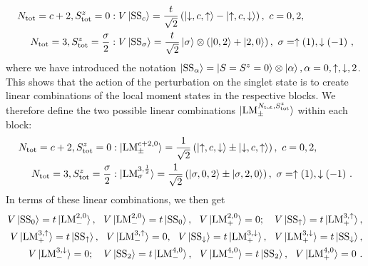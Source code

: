 \begin{eqnarray}
	N_\text{tot} = c+2, S_\text{tot}^z = 0 &: V\ket{\text{SS}_c} = \frac{t}{\sqrt 2}\left( \ket{\downarrow,c,\uparrow} - \ket{\uparrow,c,\downarrow} \right),~ c=0,2,\nonumber\\
	N_\text{tot} = 3, S_\text{tot}^z = \frac{\sigma}{2} &: V\ket{\text{SS}_\sigma} = \frac{t}{\sqrt 2}\ket{\sigma}\otimes\left(\ket{0,2} + \ket{2,0}\right),~\sigma=\uparrow(1),\downarrow(-1)~,
\end{eqnarray}
where we have introduced the notation \(\ket{\text{SS}_{\alpha}} = \ket{S=S^z=0}\otimes\ket{\alpha},\alpha=0,\uparrow,\downarrow,2\). This shows that the action of the perturbation on the singlet state is to create linear combinations of the local moment states in the respective blocks. We therefore define the two possible linear combinations \(\ket{\text{LM}_\pm^{N_\text{tot},S_\text{tot}^z}}\) within each block:
\begin{eqnarray}
	N_\text{tot} = c+2, S_\text{tot}^z = 0 &: \ket{\text{LM}_\pm^{c+2,0}} = \frac{1}{\sqrt 2}\left(\ket{\uparrow, c, \downarrow} \pm \ket{\downarrow, c, \uparrow}\right),~c=0,2,\nonumber\\
	N_\text{tot} = 3, S_\text{tot}^z = \frac{\sigma}{2} &: \ket{\text{LM}_{\sigma}^{3,\frac{1}{2}}} = \frac{1}{\sqrt 2}\left(\ket{\sigma, 0, 2} \pm \ket{\sigma, 2, 0}\right),~\sigma=\uparrow(1), \downarrow(-1)~.
\end{eqnarray}
In terms of these linear combinations, we then get
\begin{eqnarray}
	V\ket{\text{SS}_0} = t\ket{\text{LM}_-^{2,0}}, ~ ~ V\ket{\text{LM}_-^{2,0}} = t\ket{\text{SS}_0}, ~ ~V\ket{\text{LM}_+^{2,0}} = 0; \quad V\ket{\text{SS}_\uparrow} = t\ket{\text{LM}_+^{3, \uparrow}},\nonumber \\
	V\ket{\text{LM}_+^{3, \uparrow}} = t\ket{\text{SS}_\uparrow}, ~ ~V\ket{\text{LM}_-^{3, \uparrow}} = 0, ~ ~ V\ket{\text{SS}_\downarrow} = t\ket{\text{LM}_+^{3, \downarrow}}, ~ ~ V\ket{\text{LM}_+^{3, \downarrow}} = t\ket{\text{SS}_\downarrow},\nonumber \\
	V\ket{\text{LM}_-^{3, \downarrow}} = 0; \quad V\ket{\text{SS}_2} = t\ket{\text{LM}_-^{4,0}}, ~ ~ V\ket{\text{LM}_-^{4,0}} = t\ket{\text{SS}_2}, ~ ~V\ket{\text{LM}_+^{4,0}} = 0~.
\end{eqnarray}
